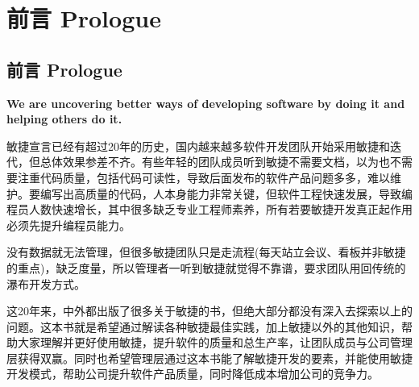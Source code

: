 \chapter*{前言 Prologue} %

\hypertarget{ux524dux8a00-prologue}{%
\section{前言 Prologue}\label{ux524dux8a00-prologue}}

\textbf{We are uncovering better ways of developing software by doing it
and helping others do it.}

\begin{description}
\item[]
\end{description}

敏捷宣言已经有超过20年的历史，国内越来越多软件开发团队开始采用敏捷和迭代，但总体效果参差不齐。有些年轻的团队成员听到敏捷不需要文档，以为也不需要注重代码质量，包括代码可读性，导致后面发布的软件产品问题多多，难以维护。要编写出高质量的代码，人本身能力非常关键，但软件工程快速发展，导致编程员人数快速增长，其中很多缺乏专业工程师素养，所有若要敏捷开发真正起作用必须先提升编程员能力。

没有数据就无法管理，但很多敏捷团队只是走流程(每天站立会议、看板并非敏捷的重点)，缺乏度量，所以管理者一听到敏捷就觉得不靠谱，要求团队用回传统的瀑布开发方式。

这20年来，中外都出版了很多关于敏捷的书，但绝大部分都没有深入去探索以上的问题。这本书就是希望通过解读各种敏捷最佳实践，加上敏捷以外的其他知识，帮助大家理解并更好使用敏捷，提升软件的质量和总生产率，让团队成员与公司管理层获得双赢。同时也希望管理层通过这本书能了解敏捷开发的要素，并能使用敏捷开发模式，帮助公司提升软件产品质量，同时降低成本增加公司的竞争力。 


